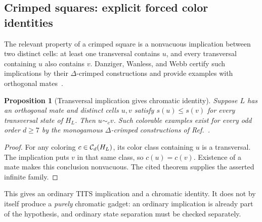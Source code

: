 \documentclass[aps,pra,reprint,superscriptaddress,longbibliography,nofootinbib,floatfix,10pt]{revtex4-2}
\newtheorem{proposition}[theorem]{Proposition}
\theoremstyle{definition}\newtheorem{definition}[theorem]{Definition}
\theoremstyle{remark}\newtheorem{remark}[theorem]{Remark}
\begin{document}
\subsection{Crimped squares: explicit forced color identities}\label{sec:crimped}

The relevant property of a crimped square is a nonvacuous implication between two distinct cells: at least one transversal contains $u$, and every transversal containing $u$ also contains $v$. Danziger, Wanless, and Webb certify such implications by their $\Delta$-crimped constructions and provide examples with orthogonal mates~\cite{danziger2011monogamous}.

\begin{proposition}[Transversal implication gives chromatic identity]\label{prop:crimped-identity}
Suppose $L$ has an orthogonal mate and distinct cells $u,v$ satisfy $s(u)\le s(v)$ for every transversal state of $H_L$. Then $u\sim_c v$. Such colorable examples exist for every odd order $d\ge7$ by the monogamous $\Delta$-crimped constructions of Ref.~\cite[Theorem 3.3]{danziger2011monogamous}.
\end{proposition}
\begin{proof}
For any coloring $c\in\mathcal C_d(H_L)$, its color class containing $u$ is a transversal. The implication puts $v$ in that same class, so $c(u)=c(v)$. Existence of a mate makes this conclusion nonvacuous. The cited theorem supplies the asserted infinite family.
\end{proof}

This gives an ordinary TITS implication and a chromatic identity. It does not by itself produce a \emph{purely} chromatic gadget: an ordinary implication is already part of the hypothesis, and ordinary state separation must be checked separately.
\end{document}
